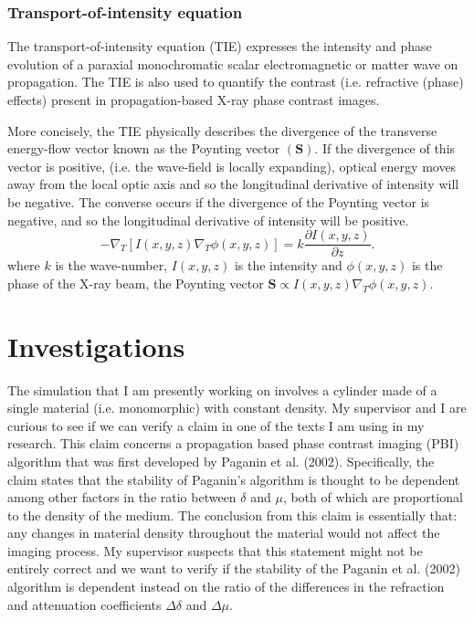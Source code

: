 \documentclass[9pt, a4paper]{article}
\begin{document}
\subsubsection{Transport-of-intensity equation}
The transport-of-intensity equation (TIE) expresses the intensity and phase evolution of a paraxial monochromatic scalar electromagnetic or matter wave on propagation\cite{Pags2002}. The TIE is also used to quantify the contrast (i.e. refractive (phase) effects) present in propagation-based X-ray phase contrast images\cite{PagsTutes}.

More concisely, the TIE physically describes the divergence of the transverse energy-flow vector known as the Poynting vector $(\textbf{S})$. If the divergence of this vector is positive, (i.e. the wave-field is locally expanding), optical energy moves away from the local optic axis and so the longitudinal derivative of
intensity will be negative. The converse occurs if the divergence of the Poynting vector is negative, and so the longitudinal derivative of intensity will be positive\cite{PagsTutes}.
\begin{equation}\label{eq:16}
-\nabla_{T} [I(x, y, z) \nabla_{T} \phi(x, y, z)] = k \frac{\partial I (x, y, z)}{\partial z}.
\end{equation}
where $k$ is the wave-number, $I(x, y, z)$ is the intensity and $\phi(x, y, z)$ is the phase of the X-ray beam, the Poynting vector $\textbf{S} \propto I(x, y, z) \nabla_{T} \phi(x, y, z)$.

\section{Investigations}
The simulation that I am presently working on involves a cylinder made of a single material (i.e. monomorphic) with constant density. My supervisor and I are curious to see if we can verify a claim in one of the texts I am using in my research. This claim concerns a propagation based phase contrast imaging (PBI) algorithm that was first developed by Paganin et al. (2002)\cite{Pags2002}\cite{CH49}. Specifically, the claim states that the stability of Paganin's algorithm is thought to be dependent among other factors in the ratio between $\delta$ and $\mu$, both of which are proportional to the density of the medium. The conclusion from this claim is essentially that: any changes in material density throughout the material would not affect the imaging process. My supervisor suspects that this statement might not be entirely correct and we want to verify if the stability of the Paganin et al. (2002) algorithm is dependent instead on the ratio of the differences in the refraction and attenuation coefficients $\Delta \delta$ and $\Delta \mu$.
\end{document}
